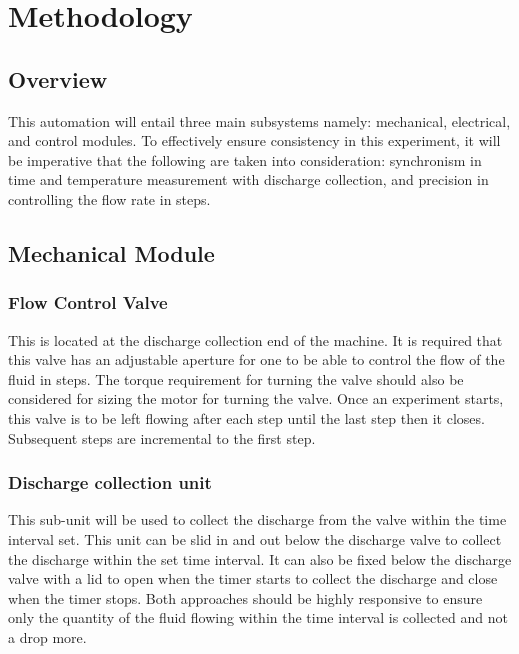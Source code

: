 \section{Methodology}
\subsection{Overview}
This automation will entail three main subsystems namely: mechanical, electrical, and control modules. To effectively ensure consistency in this experiment, it will be imperative that the following are taken into consideration: synchronism in time and temperature measurement with discharge collection, and precision in controlling the flow rate in steps.

\subsection{Mechanical Module}

\subsubsection{Flow Control Valve}

This is located at the discharge collection end of the machine. It is required that this valve has an adjustable aperture for one to be able to control the flow of the fluid in steps. The torque requirement for turning the valve should also be considered for sizing the motor for turning the valve. Once an experiment starts, this valve is to be left flowing after each step until the last step then it closes. Subsequent steps are incremental to the first step.

\subsubsection{Discharge collection unit}

This sub-unit will be used to collect the discharge from the valve within the time interval set. This unit can be slid in and out below the discharge valve to collect the discharge within the set time interval. It can also be fixed below the discharge valve with a lid to open when the timer starts to collect the discharge and close when the timer stops. Both approaches should be highly responsive to ensure only the quantity of the fluid flowing within the time interval is collected and not a drop more. 

